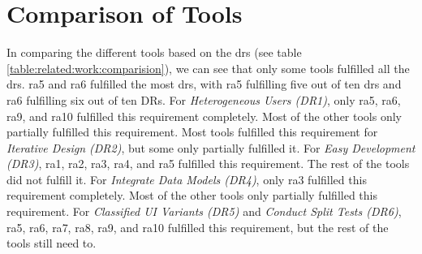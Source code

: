 \clearpage
\section{Comparison of Tools}
\label{section:related-word:comparison}
In comparing the different tools based on the \ac{dr}s (see table \ref{table:related:work:comparision}), we can see that only some tools fulfilled all the \ac{dr}s. 
\ac{ra}5 and \ac{ra}6 fulfilled the most \ac{dr}s, with \ac{ra}5 fulfilling five out of ten \ac{dr}s and \ac{ra}6 fulfilling six out of ten DRs.
For \textit{Heterogeneous Users (DR1)}, only \ac{ra}5, \ac{ra}6, \ac{ra}9, and \ac{ra}10 fulfilled this requirement completely. Most of the other tools only partially fulfilled this requirement.
Most tools fulfilled this requirement for \textit{Iterative Design (DR2)}, but some only partially fulfilled it.
For \textit{Easy Development (DR3)}, \ac{ra}1, \ac{ra}2, \ac{ra}3, \ac{ra}4, and \ac{ra}5 fulfilled this requirement. 
The rest of the tools did not fulfill it.
For \textit{Integrate Data Models (DR4)}, only \ac{ra}3 fulfilled this requirement completely. 
Most of the other tools only partially fulfilled this requirement.
For \textit{Classified UI Variants (DR5)} and \textit{Conduct Split Tests (DR6)}, \ac{ra}5, \ac{ra}6, \ac{ra}7, \ac{ra}8, \ac{ra}9, and \ac{ra}10 fulfilled this requirement, but the rest of the tools still need to.


